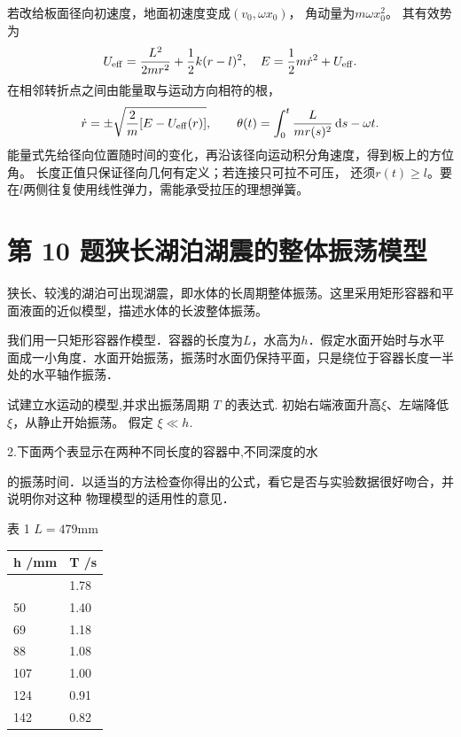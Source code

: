 \documentclass[UTF8,fontset=fandol,a4paper,11pt]{ctexart}
\newcommand{\dd}{\mathop{}\!\mathrm{d}}
\newcommand{\tagline}[1]{\noindent{\small\color{muted}#1}\par}
\begin{document}
若改给板面径向初速度，地面初速度变成$(v_0,\omega x_0)$，
角动量为$m\omega x_0^2$。
其有效势为
\[
U_{\rm eff}=\frac{L^2}{2mr^2}+\frac12k(r-l)^2,
\quad E=\frac12m\dot r^2+U_{\rm eff}.
\]
在相邻转折点之间由能量取与运动方向相符的根，
\[
\dot r=\pm\sqrt{\frac2m[E-U_{\rm eff}(r)]},\qquad
\theta(t)=\int_0^t\frac{L}{mr(s)^2}\dd s-\omega t.
\]
能量式先给径向位置随时间的变化，再沿该径向运动积分角速度，得到板上的方位角。
长度正值只保证径向几何有定义；若连接只可拉不可压，
还须$r(t)\ge l$。要在$l$两侧往复使用线性弹力，需能承受拉压的理想弹簧。




\section*{第 10 题\quad 狭长湖泊湖震的整体振荡模型}

\tagline{M-07-10}

狭长、较浅的湖泊可出现湖震，即水体的长周期整体振荡。这里采用矩形容器和平面液面的近似模型，描述水体的长波整体振荡。

我们用一只矩形容器作模型．容器的长度为\(L\)，水高为\(h\)．假定水面开始时与水平面成一小角度．水面开始振荡，振荡时水面仍保持平面，只是绕位于容器长度一半处的水平轴作振荡．

试建立水运动的模型,并求出振荡周期 \(T\) 的表达式.
初始右端液面升高\(\xi\)、左端降低\(\xi\)，从静止开始振荡。 假定
\(\xi \ll h\).

2.下面两个表显示在两种不同长度的容器中,不同深度的水

的振荡时间．以适当的方法检查你得出的公式，看它是否与实验数据很好吻合，并说明你对这种
物理模型的适用性的意见．

表 1 \(L=479 \mathrm{mm}\)

{\def\LTcaptype{none} %
\begin{longtable}[]{@{}ll@{}}
\toprule\noalign{}
h /mm & T /s \\
\midrule\noalign{}
\endhead
\bottomrule\noalign{}
\endlastfoot
30 & 1.78 \\
50 & 1.40 \\
69 & 1.18 \\
88 & 1.08 \\
107 & 1.00 \\
124 & 0.91 \\
142 & 0.82 \\
\end{longtable}
}
\end{document}
